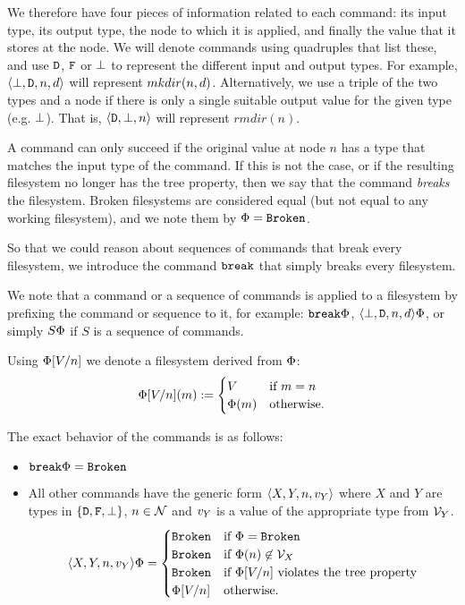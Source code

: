 We therefore have four pieces of information related to each command:
its input type, its output type, the node to which it is applied, and finally
the value that it stores at the node.
We will denote commands using quadruples that list these,
and use $\mathtt{D}$, $\mathtt{F}$ or $\bot$ to represent the different
input and output types. For example, $\langle{\bot,\mathtt{D},n,d}\rangle$ 
will represent $mkdir(n,d)$.
Alternatively, we use a triple of the two types and a node if 
there is only a single suitable output value for the given type (e.g. $\bot$).
That is, $\langle{\mathtt{D},\bot,n}\rangle$ will represent $rmdir(n)$.

\medskip

A command can only succeed if the original value at node $n$ has a type that matches
the input type of the command. If this is not the case, or if the resulting
filesystem no longer has the tree property, then we say that the command
{\em breaks} the filesystem. Broken filesystems are considered equal
(but not equal to any working filesystem), and we note them by $\Phi=\mathtt{Broken}$.

So that we could reason about sequences of commands that break every filesystem, 
we introduce the command $\mathtt{break}$ that simply breaks every filesystem.

We note that a command or a sequence of commands is applied to a filesystem
by prefixing the command or sequence to it, for example: $\mathtt{break}\Phi$, $\langle{\bot,\mathtt{D},n,d}\rangle\Phi$, 
or simply $S\Phi$ if $S$ is a sequence of commands.

\begin{mydef}
Using $\Phi[V/n]$ we denote a filesystem derived from $\Phi$:
\[ \Phi[V/n](m) :=
   \begin{cases}
   V &\mbox{if~} m=n\\
   \Phi(m) &\mbox{otherwise.}
   \end{cases}
\]
\end{mydef}

The exact behavior of the commands is as follows:
\begin{itemize}
\item $\mathtt{break}\Phi = \mathtt{Broken}$
\item
All other commands have the generic form $\langle{X,Y,n,v_Y}\rangle$ where
$X$ and $Y$ are types in $\{\mathtt{D},\mathtt{F},\bot\}$,
$n\in\mathcal{N}$ and $v_Y$ is a value of the appropriate type from $\mathcal{V}_{Y}$.
\[ \langle{X,Y,n,v_Y}\rangle\Phi = 
   \begin{cases}
   \mathtt{Broken} &\mbox{if~} \Phi=\mathtt{Broken}\\
   \mathtt{Broken} &\mbox{if~} \Phi(n)\not\in\mathcal{V}_{X}\\
   \mathtt{Broken} &\mbox{if~} \Phi[V/n] \mbox{~violates the tree property}\\
   \Phi[V/n] &\mbox{otherwise.}
   \end{cases}
\]
\end{itemize}


